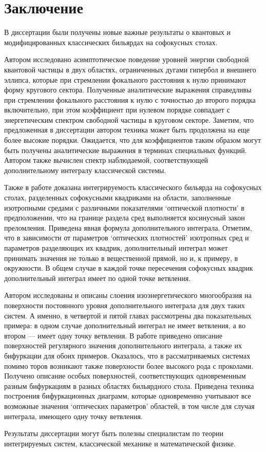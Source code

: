 \chapter*{Заключение}                   
В диссертации были получены новые важные результаты о квантовых и модифицированных классических бильярдах на софокусных столах.

Автором исследовано асимптотическое поведение уровней энергии свободной квантовой частицы в двух областях, ограниченных дугами гипербол и внешнего эллипса, которые при стремлении фокального расстояния к нулю принимают форму кругового сектора. Полученные аналитические выражения справедливы при стремлении фокального расстояния к нулю с точностью до второго порядка включительно, при этом коэффициент при нулевом порядке совпадает с энергетическим спектром свободной частицы в круговом секторе.
Заметим, что предложенная в диссертации автором техника может быть продолжена на еще более высокие порядки. 
Ожидается, что для коэффициентов таким образом могут быть получены аналитические выражения в терминах специальных функций.
Автором также вычислен спектр наблюдаемой, соответствующей дополнительному интегралу классической системы.

Также в работе доказана интегрируемость классического бильярда на софокусных столах, разделенных софокусными квадриками на области, заполненные изотропными средами с различными показателями `оптической плотности' в предположении, что на границе раздела сред выполняется косинусный закон преломления.
Приведена явная формула дополнительного интеграла. Отметим, что в зависимости от параметров `оптических плотностей' изотропных сред и параметров разделяющих их квадрик, дополнительный интеграл может принимать значения не только в вещественной прямой, но и, к примеру, в окружности. В общем случае в каждой точке пересечения софокусных квадрик дополнительный интеграл имеет по одной точке ветвления.

Автором исследованы и описаны слоения изоэнергетического многообразия на поверхности постоянного уровня дополнительного интеграла для двух таких систем. 
А именно, в четвертой и пятой главах рассмотрены два показательных примера: в одном случае дополнительный интеграл не имеет ветвления, а во втором --- имеет одну точку ветвления. В работе приведено описание  поверхностей регулярного значения дополнительного интеграла, а также их бифуркации для обоих примеров. Оказалось, что в рассматриваемых системах помимо торов возникают также поверхности более высокого рода с проколами. 
Получено описание  особых поверхностей, соответствующих одновременным разным бифуркациям в разных областях бильярдного стола. 
Приведена техника построения бифуркационных диаграмм, которые  одновременно учитывают все возможные значения `оптических параметров' областей, в том числе для случая интеграла, имеющего одну точку ветвления.

Результаты диссертации могут быть полезны специалистам по теории интегрируемых систем, классической механике и математической физике.